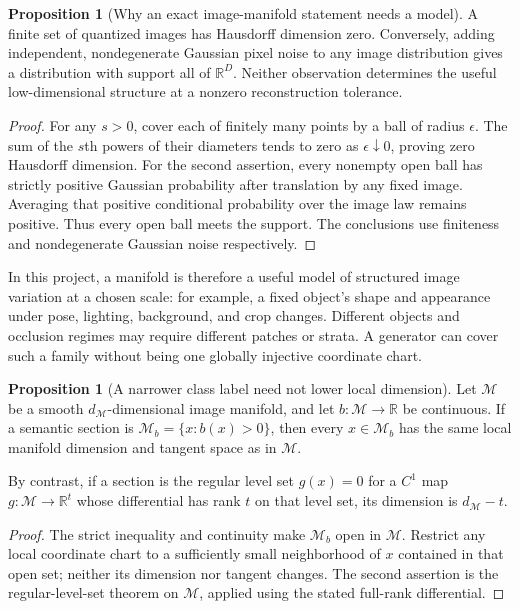 \documentclass[11pt,a4paper]{article}
\theoremstyle{definition}
\newtheorem{proposition}[theorem]{Proposition}
\theoremstyle{definition}
\theoremstyle{remark}\newtheorem{remark}[theorem]{Remark}
\newcommand{\R}{\mathbb R}\newcommand{\Prob}{\mathbb P}\newcommand{\E}{\mathbb E}
\begin{document}
\begin{proposition}[Why an exact image-manifold statement needs a model]
A finite set of quantized images has Hausdorff dimension zero. Conversely, adding independent, nondegenerate Gaussian pixel noise to any image distribution gives a distribution with support all of $\R^D$. Neither observation determines the useful low-dimensional structure at a nonzero reconstruction tolerance.
\end{proposition}
\begin{proof}
For any $s>0$, cover each of finitely many points by a ball of radius $\epsilon$. The sum of the $s$th powers of their diameters tends to zero as $\epsilon\downarrow0$, proving zero Hausdorff dimension. For the second assertion, every nonempty open ball has strictly positive Gaussian probability after translation by any fixed image. Averaging that positive conditional probability over the image law remains positive. Thus every open ball meets the support. The conclusions use finiteness and nondegenerate Gaussian noise respectively.
\end{proof}

In this project, a manifold is therefore a useful model of structured image variation at a chosen scale: for example, a fixed object's shape and appearance under pose, lighting, background, and crop changes. Different objects and occlusion regimes may require different patches or strata. A generator can cover such a family without being one globally injective coordinate chart.

\begin{proposition}[A narrower class label need not lower local dimension]\label{prop:labeldimension}
Let $\mathcal M$ be a smooth $d_{\mathcal M}$-dimensional image manifold, and let $b:\mathcal M\to\R$ be continuous. If a semantic section is $\mathcal M_b=\{x:b(x)>0\}$, then every $x\in\mathcal M_b$ has the same local manifold dimension and tangent space as in $\mathcal M$.

By contrast, if a section is the regular level set $g(x)=0$ for a $C^1$ map $g:\mathcal M\to\R^t$ whose differential has rank $t$ on that level set, its dimension is $d_{\mathcal M}-t$.
\end{proposition}
\begin{proof}
The strict inequality and continuity make $\mathcal M_b$ open in $\mathcal M$. Restrict any local coordinate chart to a sufficiently small neighborhood of $x$ contained in that open set; neither its dimension nor tangent changes. The second assertion is the regular-level-set theorem on $\mathcal M$, applied using the stated full-rank differential.
\end{proof}
\end{document}
